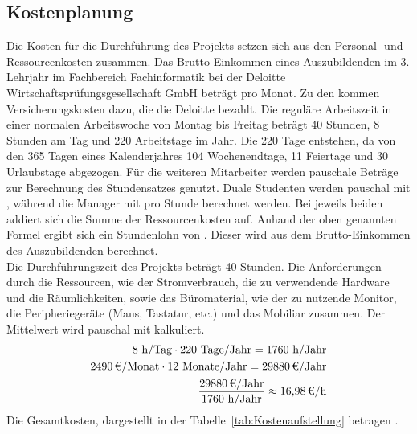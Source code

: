\subsection{Kostenplanung}
\label{sec:Kostenplanung}
Die Kosten für die Durchführung des Projekts setzen sich aus den Personal- und Ressourcenkosten zusammen.   
Das Brutto-Einkommen eines Auszubildenden im 3. Lehrjahr im Fachbereich Fachinformatik bei der Deloitte Wirtschaftsprüfungsgesellschaft GmbH 
beträgt  pro Monat. Zu den  kommen  Versicherungskosten dazu, die die Deloitte bezahlt. 
Die reguläre Arbeitszeit in einer normalen Arbeitswoche von Montag bis Freitag beträgt 40 Stunden, 8 Stunden am Tag und 
220 Arbeitstage im Jahr. Die 220 Tage entstehen, da von den 365 Tagen eines Kalenderjahres 104 Wochenendtage, 11 Feiertage und 30 Urlaubstage abgezogen.
Für die weiteren Mitarbeiter werden pauschale Beträge zur Berechnung des Stundensatzes genutzt. 
Duale Studenten werden pauschal mit , während die Manager mit  pro Stunde berechnet werden. 
Bei jeweils beiden addiert sich die Summe der Ressourcenkosten auf.
Anhand der oben genannten Formel ergibt sich ein Stundenlohn von . Dieser wird aus dem Brutto-Einkommen des Auszubildenden berechnet.
\\Die Durchführungszeit des Projekts beträgt 40 Stunden. 
Die Anforderungen durch die Ressourcen, wie der Stromverbrauch, die zu verwendende Hardware und die Räumlichkeiten, sowie das Büromaterial, 
wie \zB der zu nutzende Monitor, die Peripheriegeräte (Maus, Tastatur, etc.) und das Mobiliar zusammen.
Der Mittelwert wird pauschal mit  kalkuliert.  
\begin{eqnarray}
	8 \mbox{ h/Tag} \cdot 220 \mbox{ Tage/Jahr} = 1760 \mbox{ h/Jahr}\\
	\eur{2490}\mbox{/Monat} \cdot 12 \mbox{ Monate/Jahr} = \eur{29880} \mbox{/Jahr}\\
	\frac{\eur{29880} \mbox{/Jahr}}{1760 \mbox{ h/Jahr}} \approx \eur{16,98}\mbox{/h}
\end{eqnarray}
Die Gesamtkosten, dargestellt in der Tabelle~\ref{tab:Kostenaufstellung} betragen .

